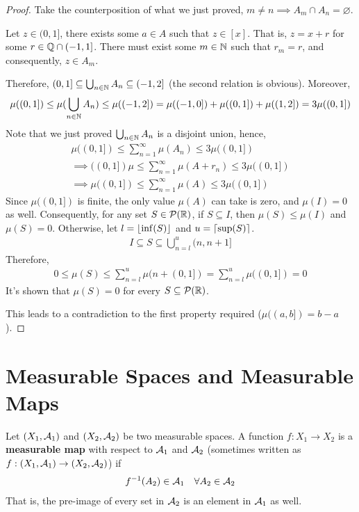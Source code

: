 \documentclass[11pt]{article}
\begin{document}
\begin{proof}
		Take the counterposition of what we just proved, $m \neq n \implies A_m \cap A_n = \varnothing$.
		
		Let $z \in (0, 1]$, there exists some $a \in A$ such that $z \in [x]$. That is, $z = x + r$ for some $r \in \mathbb{Q} \cap (-1, 1]$. There must exist some $m \in \mathbb{N}$ such that $r_m = r$, and consequently, $z \in A_m$.
		 
		Therefore, $(0, 1] \subseteq \bigcup_{n\in \mathbb{N}} A_n \subseteq (-1, 2]$ (the second relation is obvious). Moreover,
		\begin{align}
			\mu((0, 1]) \leq \mu(\bigcup_{n\in \mathbb{N}} A_n) \leq \mu((-1, 2]) = \mu((-1, 0]) + \mu((0, 1]) + \mu((1, 2]) = 3 \mu((0, 1])
		\end{align}
		Note that we just proved $\bigcup_{n\in \mathbb{N}} A_n$ is a disjoint union, hence,
		\begin{align}
			\mu((0, 1]) \leq \sum_{n=1}^\infty \mu(A_n) \leq 3\mu((0, 1]) \\
			\implies((0, 1]) \mu \leq \sum_{n=1}^\infty \mu(A + r_n) \leq 3\mu((0, 1]) \\
			\implies \mu((0, 1]) \leq \sum_{n=1}^\infty \mu(A) \leq 3\mu((0, 1])
		\end{align}
		Since $\mu((0, 1])$ is finite, the only value $\mu(A)$ can take is zero, and $\mu(I) = 0$ as well. Consequently, for any set $S \in \mathcal{{P}}(\mathbb{R})$, if $S \subseteq I$, then $\mu(S) \leq \mu(I)$ and $\mu(S) = 0$. Otherwise, let $l = \lfloor\inf(S)\rfloor$ and $u = \lceil\sup(S)\rceil$.
		\begin{align}
			I \subseteq S \subseteq \bigcup_{n=l}^{u} (n, n+1]
		\end{align}
		Therefore,
		\begin{align}
			0 \leq \mu(S) \leq \sum_{n=l}^{u} \mu(n + (0, 1]) = \sum_{n=l}^{u} \mu((0, 1]) = 0
		\end{align}
		It's shown that $\mu(S) = 0$ for every $S \subseteq \mathcal{{P}}(\mathbb{R})$.
		
		This leads to a contradiction to the first property required ($\mu((a, b]) = b-a$).
	\end{proof}
	
	\section{Measurable Spaces and Measurable Maps}
	\begin{definition}
		Let $(X_1, \mathcal{{A}}_1)$ and $(X_2, \mathcal{{A}}_2)$ be two measurable spaces. A function $f: X_1 \to X_2$ is a \textbf{measurable map} with respect to $\mathcal{{A}}_1$ and $\mathcal{{A}}_2$ (sometimes written as $f: (X_1, \mathcal{{A}}_1) \to (X_2, \mathcal{{A}}_2)$) if
		\begin{align}
			f^{-1}(A_2) \in \mathcal{{A}}_1\quad \forall A_2 \in \mathcal{{A}}_2
		\end{align}
		That is, the pre-image of every set in $\mathcal{{A}}_2$ is an element in $\mathcal{{A}}_1$ as well.
	\end{definition}
	
\end{document}
